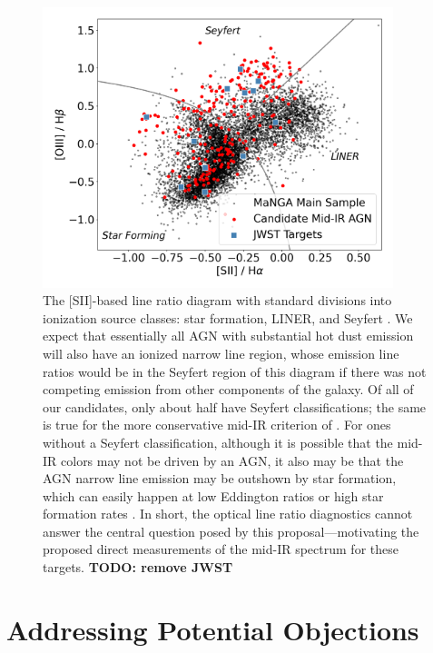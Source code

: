 \documentclass[12pt, preprint]{hacked-aastex}
\begin{document}
\begin{figure}[h!]
\begin{center}
\includegraphics[width=0.91\textwidth]{bpt-agn.png}
\end{center}
\caption{\label{fig:bpt}
The 
[SII]-based line ratio diagram \cite{veilleux87a}
with standard divisions into ionization source classes:
star formation, LINER, and Seyfert \cite{kewley06a}. 
We expect that essentially all AGN with substantial
hot dust emission will also have an ionized narrow
line region, whose emission line ratios would 
be in the Seyfert region of this diagram if there
was not competing emission from other components
of the galaxy. Of all of our candidates, only about
half have Seyfert classifications; the same is 
true for the more conservative mid-IR criterion
of \cite{assef18a}. For ones without a Seyfert
classification, although it 
is possible that the mid-IR
colors may not be driven by an AGN,
it also may be that the AGN narrow line
emission may be outshown by star formation,
which can easily happen at low Eddington ratios
or high star formation rates \cite{trump15a}.
In short, the optical line ratio diagnostics cannot answer
the central question posed by this proposal---motivating
the proposed direct measurements of the mid-IR spectrum for these targets.
{\bf TODO: remove JWST}}
\end{figure}

\section{Addressing Potential Objections}
\label{sec:objections}
\end{document}
